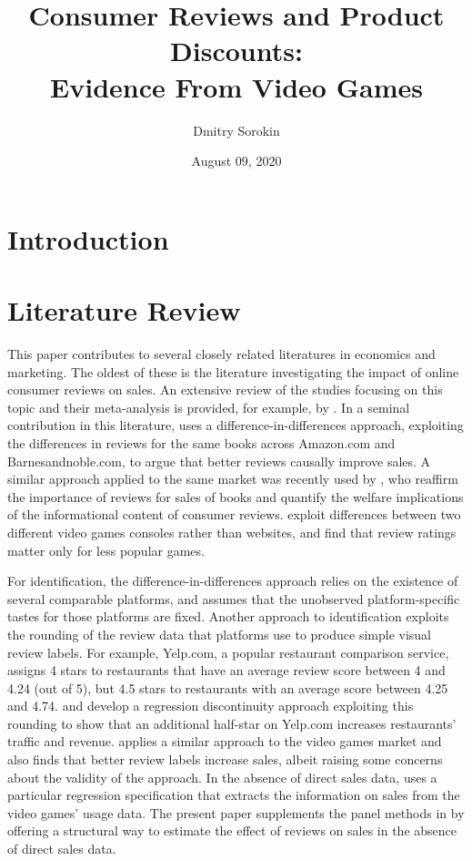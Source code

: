 \documentclass[12pt,pagebackref]{article}
\title{Consumer Reviews and Product Discounts:\\
Evidence From Video Games}
\author{Dmitry Sorokin}
\date{August 09, 2020}
\begin{document}
\maketitle

\hypertarget{introduction}{%
\section{Introduction}\label{introduction}}

\hypertarget{literature-review}{%
\section{Literature Review}\label{literature-review}}

This paper contributes to several closely related literatures in
economics and marketing. The oldest of these is the literature
investigating the impact of online consumer reviews on sales. An
extensive review of the studies focusing on this topic and their
meta-analysis is provided, for example, by \citet{Floyd14}. In a seminal
contribution in this literature, \citet{ChevalierMayzlin06} uses a
difference-in-differences approach, exploiting the differences in
reviews for the same books across Amazon.com and Barnesandnoble.com, to
argue that better reviews causally improve sales. A similar approach
applied to the same market was recently used by
\citet{ReimersWaldfogel20}, who reaffirm the importance of reviews for
sales of books and quantify the welfare implications of the
informational content of consumer reviews. \citet{ZhuZhang10} exploit
differences between two different video games consoles rather than
websites, and find that review ratings matter only for less popular
games.

For identification, the difference-in-differences approach relies on the
existence of several comparable platforms, and assumes that the
unobserved platform-specific tastes for those platforms are fixed.
Another approach to identification exploits the rounding of the review
data that platforms use to produce simple visual review labels. For
example, Yelp.com, a popular restaurant comparison service, assigns 4
stars to restaurants that have an average review score between 4 and
4.24 (out of 5), but 4.5 stars to restaurants with an average score
between 4.25 and 4.74. \citet{AndersonMagruder12} and \citet{Luca16}
develop a regression discontinuity approach exploiting this rounding to
show that an additional half-star on Yelp.com increases restaurants'
traffic and revenue. \citet{SorokinStevens20} applies a similar approach
to the video games market and also finds that better review labels
increase sales, albeit raising some concerns about the validity of the
approach. In the absence of direct sales data, \citet{SorokinStevens20}
uses a particular regression specification that extracts the information
on sales from the video games' usage data. The present paper supplements
the panel methods in \citet{SorokinStevens20} by offering a structural
way to estimate the effect of reviews on sales in the absence of direct
sales data.
\end{document}
